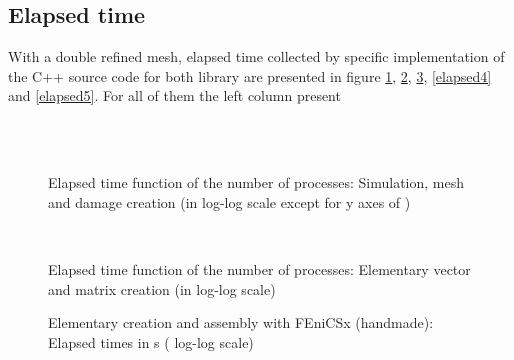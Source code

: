 \documentclass[12pt]{article}
\newcommand{\f}[1]{FEniCSx#1}
\begin{document}
\subsection{Elapsed time}
With a double refined mesh, elapsed time collected by specific implementation of the C++ source code for both library are presented in figure \ref{elapsed1}, \ref{elapsed2}, \ref{time_ass_f}, \ref{elapsed4} and \ref{elapsed5}. 
For all of them the left column present
\begin{figure}
	\subfloat[Simulation (in s)]{	
		
		\label{time_simu}
	}
	\\
	\subfloat[Mesh (in s)]{
		
		\label{time_mesh}
	}
	\\
	\caption{Elapsed time function of the number of processes: Simulation, mesh and damage creation (in log-log scale except for y axes of \protect{}  )\label{elapsed1}}
\end{figure}
\begin{figure}
	\\
	\caption{Elapsed time function of the number of processes: Elementary vector and matrix creation (in log-log scale)\label{elapsed2}}
\end{figure}
\begin{figure}
	
	\caption{Elementary creation and assembly with \f{} (handmade): Elapsed times in s ( log-log scale)\label{time_ass_f}}
\end{figure}
\end{document}
